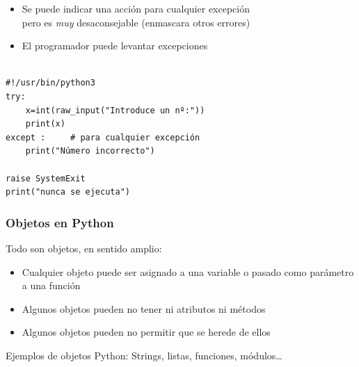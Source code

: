 \begin{frame}[fragile]

\begin{itemize}
\item Se puede indicar una acción para cualquier excepción\\
      pero es \emph{muy} desaconsejable (enmascara otros errores)
\item  El programador puede levantar excepciones
\end{itemize}

  \begin{footnotesize}
\begin{verbatim}

#!/usr/bin/python3
try:
    x=int(raw_input("Introduce un nº:"))
    print(x)
except :     # para cualquier excepción
    print("Número incorrecto")

raise SystemExit
print("nunca se ejecuta")
\end{verbatim}
  \end{footnotesize}


\end{frame}









\begin{frame}
\frametitle{Objetos en Python}

Todo son objetos, en sentido amplio:
\begin{itemize}
\item Cualquier objeto puede ser asignado a una variable o pasado como
  parámetro a una función
\item Algunos objetos pueden no tener ni atributos ni métodos
\item Algunos objetos pueden no permitir que se herede de ellos
\end{itemize}

Ejemplos de objetos Python: Strings, listas, funciones, módulos\ldots
\end{frame}



